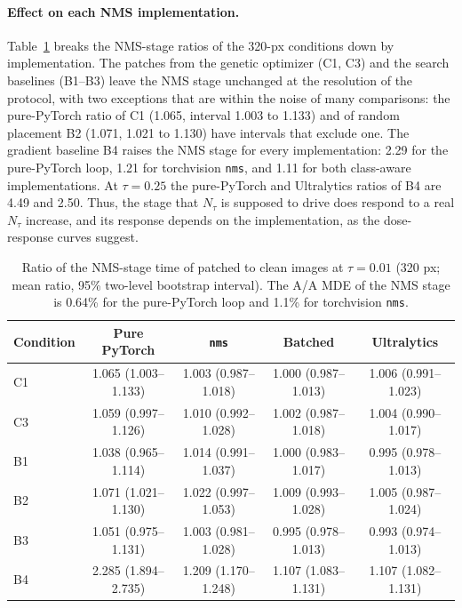 \documentclass[a4paper,fleqn]{cas-dc}
\newcommand{\Ntau}{N_{\tau}}
\begin{document}
\paragraph{Effect on each NMS implementation.}
Table~\ref{tab:impl} breaks the NMS-stage ratios of the 320-px conditions down by implementation. The patches from the genetic optimizer (C1, C3) and the search baselines (B1--B3) leave the NMS stage unchanged at the resolution of the protocol, with two exceptions that are within the noise of many comparisons: the pure-PyTorch ratio of C1 (1.065, interval 1.003 to 1.133) and of random placement B2 (1.071, 1.021 to 1.130) have intervals that exclude one. The gradient baseline B4 raises the NMS stage for every implementation: 2.29 for the pure-PyTorch loop, 1.21 for torchvision \texttt{nms}, and 1.11 for both class-aware implementations. At $\tau=0.25$ the pure-PyTorch and Ultralytics ratios of B4 are 4.49 and 2.50. Thus, the stage that $\Ntau$ is supposed to drive does respond to a real $\Ntau$ increase, and its response depends on the implementation, as the dose-response curves suggest.

\begin{table}[t]
\centering\small
\caption{Ratio of the NMS-stage time of patched to clean images at $\tau=0.01$ (320 px; mean ratio, 95\% two-level bootstrap interval). The A/A MDE of the NMS stage is 0.64\% for the pure-PyTorch loop and 1.1\% for torchvision \texttt{nms}.}
\label{tab:impl}
\begin{tabular}{@{}lcccc@{}}
\toprule
Condition & Pure PyTorch & \texttt{nms} & Batched & Ultralytics \\
\midrule
C1 & 1.065 (1.003--1.133) & 1.003 (0.987--1.018) & 1.000 (0.987--1.013) & 1.006 (0.991--1.023) \\
C3 & 1.059 (0.997--1.126) & 1.010 (0.992--1.028) & 1.002 (0.987--1.018) & 1.004 (0.990--1.017) \\
B1 & 1.038 (0.965--1.114) & 1.014 (0.991--1.037) & 1.000 (0.983--1.017) & 0.995 (0.978--1.013) \\
B2 & 1.071 (1.021--1.130) & 1.022 (0.997--1.053) & 1.009 (0.993--1.028) & 1.005 (0.987--1.024) \\
B3 & 1.051 (0.975--1.131) & 1.003 (0.981--1.028) & 0.995 (0.978--1.013) & 0.993 (0.974--1.013) \\
B4 & 2.285 (1.894--2.735) & 1.209 (1.170--1.248) & 1.107 (1.083--1.131) & 1.107 (1.082--1.131) \\
\bottomrule
\end{tabular}
\end{table}
\end{document}
